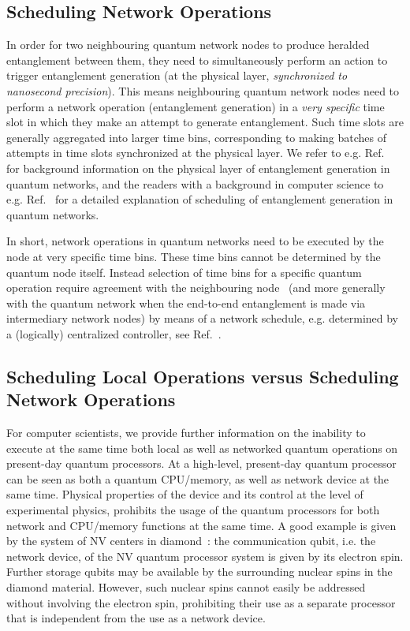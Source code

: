 \subsection{Scheduling Network Operations}

In order for two neighbouring quantum network nodes to produce heralded entanglement between them, they need to simultaneously perform an action to trigger entanglement generation (at the physical layer, \emph{synchronized to nanosecond precision}). This means neighbouring quantum network nodes need to perform a network operation (entanglement generation) in a \emph{very specific} time slot in which they make an attempt to generate entanglement. Such time slots are generally aggregated into larger time bins, corresponding to making batches of attempts in time slots synchronized at the physical layer. We refer to e.g. Ref.~\cite{pompili_2022_experimental} for background information on the physical layer of entanglement generation in quantum networks, and the readers with a background in computer science to e.g. Ref.~\cite{dahlberg_2019_egp} for a detailed explanation of scheduling of entanglement generation in quantum networks.

In short, network operations in quantum networks need to be executed by the node at very specific time bins. These time bins cannot be determined by the quantum node itself. Instead selection of time bins for a specific quantum operation require agreement with the neighbouring node~\cite{dahlberg_2019_egp} (and more generally with the quantum network when the end-to-end entanglement is made via intermediary network nodes) by means of a network schedule, e.g. determined by a (logically) centralized controller, see Ref.~\cite{skrzypczyk_2021_arch}.

\subsection{Scheduling Local Operations versus Scheduling Network Operations}

For computer scientists, we provide further information on the inability to execute at the same time both local as well as networked quantum operations on present-day quantum processors. At a high-level, present-day quantum processor can be seen as both a quantum \ac{CPU}/memory, as well as network device at the same time. Physical properties of the device and its control at the level of experimental physics, prohibits the usage of the quantum processors for both network and \ac{CPU}/memory functions at the same time. A good example is given by the system of \ac{NV} centers in diamond~\cite{kalb_2017_entanglement,humphreys_2018_delivery}: the communication qubit, i.e. the network device, of the \ac{NV} quantum processor system is given by its electron spin. Further storage qubits may be available by the surrounding nuclear spins in the diamond material. However, such nuclear spins cannot easily be addressed without involving the electron spin, prohibiting their use as a separate processor that is independent from the use as a network device. 

